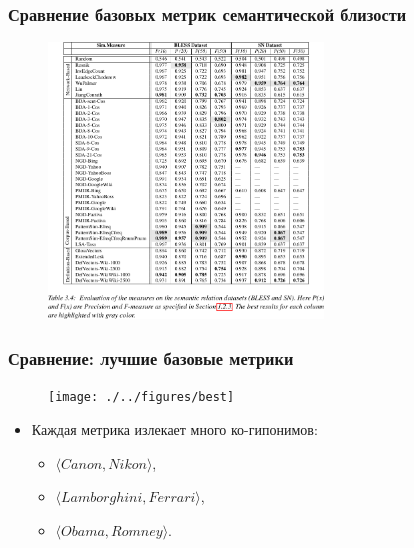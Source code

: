 \begin{frame}
\frametitle{Сравнение базовых метрик семантической близости}

\begin{figure}
\includegraphics[width=0.65\textwidth]{./figures/overview-table2}
\end{figure}
   
\end{frame}






\begin{frame}
\frametitle{Сравнение: лучшие базовые метрики}

\begin{figure}
\texttt{[image: ./../figures/best]}

\end{figure}

\begin{itemize}
  \item Каждая метрика излекает много \alert{ко-гипонимов}: 
  \begin{itemize}
  \item $\langle Canon, Nikon \rangle$,
  \item $\langle Lamborghini, Ferrari \rangle$,
  \item $\langle Obama, Romney \rangle$.
\end{itemize}
\end{itemize}
   
\end{frame}





